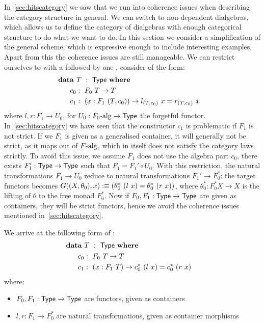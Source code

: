\documentclass[a4paper,10pt]{report}
\begin{document}
In~\cref{sec:hitscategory} we saw that we run into coherence issues
when describing the category structure in general. We can switch to
non-dependent dialgebras, which allows us to define the category of
dialgebras with enough categorical structure to do what we want to
do. In this section we consider a simplification of the general
scheme, which is expressive enough to include interesting
examples. Apart from this the coherence issues are still
manageable. We can restrict ourselves to \hits with a
\zeroconstructors followed by one \oneconstructor, \ie consider \hits
of the form:
%
\begin{alignat*}{2}
  &\rlap{$\data\ T\ :\ \Type\ \where$} \\
  &&\ \ c_0  &:\ F_0\ T \to T \\
  &&\ \ c_1  &:\ (x : F_1\ (T,c_0)) \to l_{(T,c_0)}\ x = r_{(T,c_0)}\ x
\end{alignat*}
%
where $l, r : F_1 \to U_0$, for $U_0 : F_0\mbox{-alg} \to \mathsf{Type}$ the
forgetful functor. In~\cref{sec:hitscategory} we have seen that the
constructor $c_1$ is problematic if $F_1$ is not strict. If we $F_1$
is given as a generalised container, it will generally not be strict,
as it maps out of $F\mbox{-alg}$, which in itself does not satisfy the
category laws strictly. To avoid this issue, we assume $F_1$ does not
use the algebra part $c_0$, \ie there exists $F_1' : \mathsf{Type} \to \mathsf{Type}$
such that $F_1 = F_1' \circ U_0$. With this restriction, the natural
transformations $F_1 \to U_0$ reduce to natural transformations
$F_1' \to F_0^*$: the target functors becomes
$G ((X,\theta_0), x) :\equiv (\theta_0^*\ (l\ x) = \theta_0^*\ (r\
x))$,
where $\theta_0^* : F_0^* X \to X$ is the lifting of $\theta$ to the
free monad $F_0^*$. Now if $F_0, F_1 : \mathsf{Type} \to \mathsf{Type}$ are given as
containers, they will be strict functors, hence we avoid the coherence
issues mentioned in~\cref{sec:hitscategory}.

We arrive at the following form of \hits:
%
\begin{alignat*}{2}
  &\rlap{$\data\ T\ :\ \Type\ \where$} \\
  &&\ \ c_0  &:\ F_0\ T \to T \\
  &&\ \ c_1  &:\ (x : F_1\ T) \to c_0^*\ (l\ x) = c_0^*\ (r\ x)
\end{alignat*}
%
where:
\begin{itemize}
\item $F_0, F_1 : \mathsf{Type} \to \mathsf{Type}$ are functors, given as containers
\item $l, r : F_1 \to F_0^*$ are natural transformations, given as container morphisms
\end{itemize}
\end{document}
